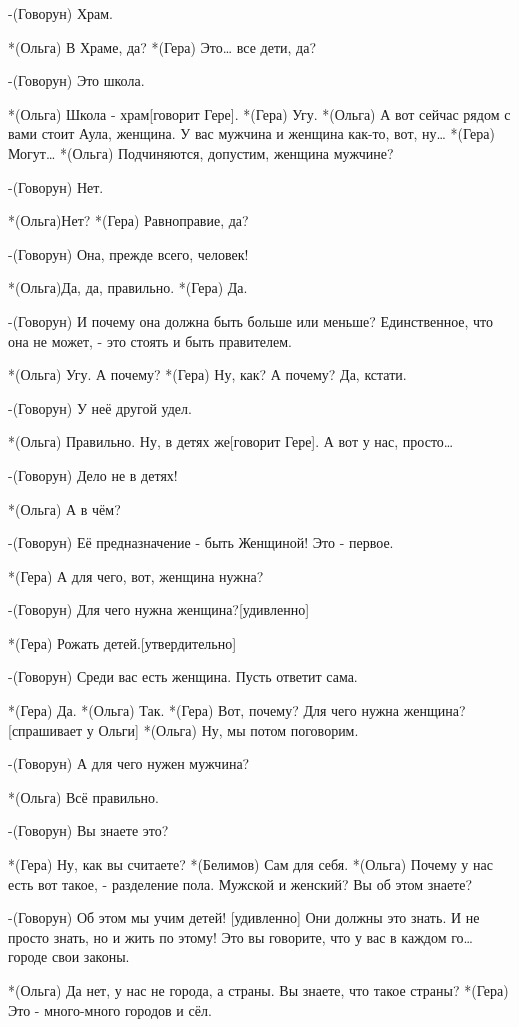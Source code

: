 -(Говорун) Храм.

*(Ольга) В Храме, да?
*(Гера) Это… все дети, да?

-(Говорун) Это школа.

*(Ольга) Школа - храм[говорит Гере].
*(Гера) Угу.
*(Ольга) А вот сейчас рядом с вами стоит Аула, женщина. У вас мужчина и женщина как-то, вот, ну…
*(Гера) Могут…
*(Ольга) Подчиняются, допустим, женщина мужчине?

-(Говорун) Нет.

*(Ольга)Нет?
*(Гера) Равноправие, да?

-(Говорун) Она, прежде всего, человек!

*(Ольга)Да, да, правильно.
*(Гера) Да.

-(Говорун) И почему она должна быть больше или меньше? Единственное, что она не может, - это стоять и быть правителем.

*(Ольга) Угу. А почему?
*(Гера) Ну, как? А почему? Да, кстати.

-(Говорун) У неё другой удел.

*(Ольга) Правильно. Ну, в детях же[говорит Гере]. А вот у нас, просто…

-(Говорун) Дело не в детях!

*(Ольга) А в чём?

-(Говорун) Её предназначение - быть Женщиной! Это - первое.

*(Гера) А для чего, вот, женщина нужна?

-(Говорун) Для чего нужна женщина?[удивленно]

*(Гера) Рожать детей.[утвердительно]

-(Говорун) Среди вас есть женщина. Пусть ответит сама.

*(Гера) Да.
*(Ольга) Так.
*(Гера) Вот, почему? Для чего нужна женщина? [спрашивает у Ольги]
*(Ольга) Ну, мы потом поговорим.

-(Говорун) А для чего нужен мужчина?

*(Ольга) Всё правильно.

-(Говорун) Вы знаете это?

*(Гера) Ну, как вы считаете?
*(Белимов) Сам для себя.
*(Ольга) Почему у нас есть вот такое, - разделение пола. Мужской и женский? Вы об этом знаете?

-(Говорун) Об этом мы учим детей! [удивленно] Они должны это знать. И не просто знать, но и жить по этому! Это вы говорите, что у вас в каждом го… городе свои законы.

*(Ольга) Да нет, у нас не города, а страны. Вы знаете, что такое страны?
*(Гера) Это - много-много городов и сёл.


